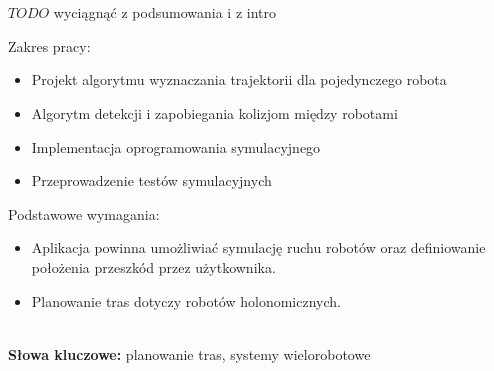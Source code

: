 \\

\\

\begin{singlespacing}

$TODO$ wyciągnąć z podsumowania i z intro

Zakres pracy:
\begin{itemize}
	\item Projekt algorytmu wyznaczania trajektorii dla pojedynczego robota
	\item Algorytm detekcji i zapobiegania kolizjom między robotami
	\item Implementacja oprogramowania symulacyjnego
	\item Przeprowadzenie testów symulacyjnych
\end{itemize}

Podstawowe wymagania:
\begin{itemize}
	\item Aplikacja powinna umożliwiać symulację ruchu robotów oraz definiowanie położenia przeszkód przez użytkownika.
	\item Planowanie tras dotyczy robotów holonomicznych.
\end{itemize}


\flushbottom
\textbf{\\Słowa kluczowe: }planowanie tras, systemy wielorobotowe
\end{singlespacing}
